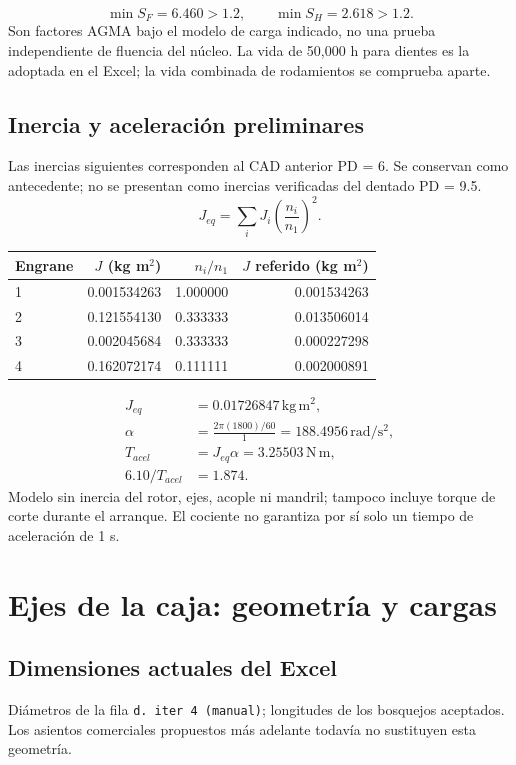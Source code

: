 \documentclass[11pt,a4paper]{article}
\begin{document}
\[
\min S_F=6.460>1.2,\qquad\min S_H=2.618>1.2.
\]
Son factores AGMA bajo el modelo de carga indicado, no una prueba independiente de fluencia del núcleo. La vida de 50,000 h para dientes es la adoptada en el Excel; la vida combinada de rodamientos se comprueba aparte.

\subsection{Inercia y aceleración preliminares}
Las inercias siguientes corresponden al CAD anterior PD = 6. Se conservan como antecedente; no se presentan como inercias verificadas del dentado PD = 9.5.
\[
J_{eq}=\sum_iJ_i\left(\frac{n_i}{n_1}\right)^2.
\]

\begin{center}\small\begin{tabular}{lrrr}\toprule

Engrane & $J$ (kg m$^2$) & $n_i/n_1$ & $J$ referido (kg m$^2$) \\ \midrule

1 & 0.001534263 & 1.000000 & 0.001534263 \\

2 & 0.121554130 & 0.333333 & 0.013506014 \\

3 & 0.002045684 & 0.333333 & 0.000227298 \\

4 & 0.162072174 & 0.111111 & 0.002000891 \\

\bottomrule\end{tabular}\end{center}

\begin{align*}
J_{eq}&=0.01726847\,\mathrm{kg\,m^2},\\
\alpha&=\frac{2\pi(1800)/60}{1}=188.4956\,\mathrm{rad/s^2},\\
T_{acel}&=J_{eq}\alpha=3.25503\,\mathrm{N\,m},\\
6.10/T_{acel}&=1.874.
\end{align*}
Modelo sin inercia del rotor, ejes, acople ni mandril; tampoco incluye torque de corte durante el arranque. El cociente no garantiza por sí solo un tiempo de aceleración de 1 s.
\clearpage
\section{Ejes de la caja: geometría y cargas}
\subsection{Dimensiones actuales del Excel}
Diámetros de la fila \texttt{d. iter 4 (manual)}; longitudes de los bosquejos aceptados. Los asientos comerciales propuestos más adelante todavía no sustituyen esta geometría.
\end{document}
